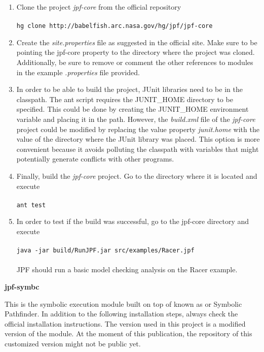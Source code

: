\begin{enumerate}
	\item Clone the project \textit{jpf-core} from the official repository \\ \\
		\lstinline[]|hg clone http://babelfish.arc.nasa.gov/hg/jpf/jpf-core|
	\item Create the \textit{site.properties} file as suggested in the official \jpf{} site. Make sure to be pointing the jpf-core property to the directory where the project was cloned. Additionally, be sure to remove or comment the other references to modules in the example \textit{.properties} file provided.
	\item In order to be able to build the project, JUnit libraries need to be in the classpath. The ant script requires the JUNIT\_HOME directory to be specified. This could be done by creating the JUNIT\_HOME environment variable and placing it in the path. However, the \textit{build.xml} file of the \textit{jpf-core} project could be modified by replacing the value property \textit{junit.home} with the value of the directory where the JUnit library was placed. This option is more convenient because it avoids polluting the classpath with variables that might potentially generate conflicts with other programs.
	\item Finally, build the \textit{jpf-core} project. Go to the directory where it is located and execute \\ \\
		\lstinline[]|ant test|
	\item In order to test if the build was successful, go to the jpf-core directory and execute \\ \\
		\lstinline[]|java -jar build/RunJPF.jar src/examples/Racer.jpf| \\ \\
	JPF should run a basic model checking analysis on the Racer example.	
\end{enumerate}

\textbf{jpf-symbc}

This is the symbolic execution module built on top of \jpf{} known as \spf{} or Symbolic Pathfinder. In addition to the following installation steps, always check the official installation instructions. The version used in this project is a modified version of the module. At the moment of this publication, the repository of this customized version might not be public yet.

